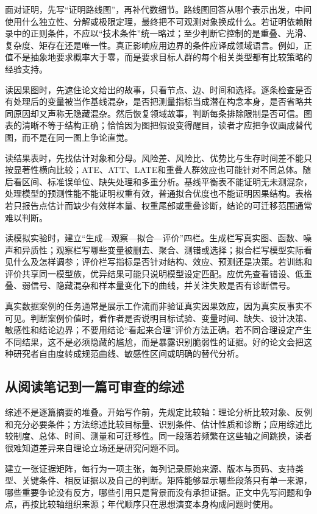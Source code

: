 面对证明，先写“证明路线图”，再补代数细节。路线图回答从哪个表示出发，中间使用什么独立性、分解或极限定理，最终把不可观测对象换成什么。若证明依赖附录中的正则条件，不应以“技术条件”统一略过；至少判断它控制的是重叠、光滑、复杂度、矩存在还是唯一性。真正影响应用边界的条件应译成领域语言。例如，正值不是抽象地要求概率大于零，而是要求目标人群的每个相关类型都有比较策略的经验支持。

读因果图时，先遮住论文给出的故事，只看节点、边、时间和选择。逐条检查是否有处理后的变量被当作基线混杂，是否把测量指标当成潜在构念本身，是否省略共同原因却又声称无隐藏混杂。然后恢复领域故事，判断每条排除限制是否可信。图表的清晰不等于结构正确；恰恰因为图把假设变得醒目，读者才应把争议画成替代图，而不是在同一图上争论直觉。

读结果表时，先找估计对象和分母。风险差、风险比、优势比与生存时间差不能只按显著性横向比较；ATE、ATT、LATE和重叠人群效应也可能针对不同总体。随后看区间、标准误单位、缺失处理和多重分析。基线平衡表不能证明无未测混杂，处理模型的预测性能不能证明权重有效，普通拟合优度也不能证明因果结构。表格若只报告点估计而缺少有效样本量、权重尾部或重叠诊断，结论的可迁移范围通常难以判断。

读模拟实验时，建立“生成---观察---拟合---评价”四栏。生成栏写真实图、函数、噪声和异质性；观察栏写哪些变量被删去、聚合、测错或选择；拟合栏写模型实际看见什么及怎样调参；评价栏写指标是否针对结构、效应、预测还是决策。若训练和评价共享同一模型族，优异结果可能只说明模型设定匹配。应优先查看错设、低重叠、弱信号、隐藏混杂和样本量变化下的曲线，并关注失败是否有诊断信号。

真实数据案例的任务通常是展示工作流而非验证真实因果效应，因为真实反事实不可见。判断案例价值时，看作者是否说明目标试验、变量时间、缺失、设计决策、敏感性和结论边界；不要用结论“看起来合理”评价方法正确。若不同合理设定产生不同结果，这不是必须隐藏的尴尬，而是暴露识别脆弱性的证据。好的论文会把这种研究者自由度转成规范曲线、敏感性区间或明确的替代分析。

\subsection*{从阅读笔记到一篇可审查的综述}

综述不是逐篇摘要的堆叠。开始写作前，先规定比较轴：理论分析比较对象、反例和充分必要条件；方法综述比较目标量、识别条件、估计性质和诊断；应用综述比较制度、总体、时间、测量和可迁移性。同一段落若频繁在这些轴之间跳换，读者很难知道差异来自理论立场还是研究问题不同。

建立一张证据矩阵，每行为一项主张，每列记录原始来源、版本与页码、支持类型、关键条件、相反证据以及自己的判断。矩阵能够显示哪些段落只有单一来源，哪些重要争论没有反方，哪些引用只是背景而没有承担证据。正文中先写问题和争点，再按比较轴组织来源；年代顺序只在思想演变本身构成问题时使用。

